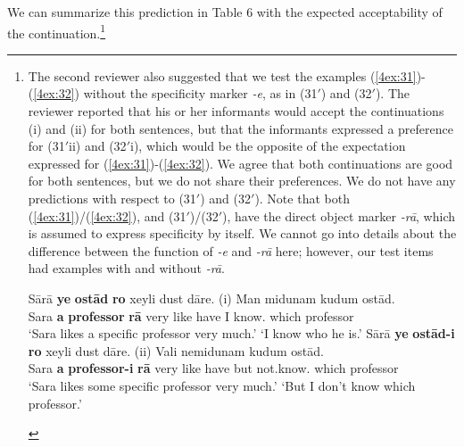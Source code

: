 \documentclass[output=paper]{langsci/langscibook}
\begin{document}
\largerpage[2]
We can summarize this prediction in Table 6 with the expected acceptability of the continuation.\footnote{The second reviewer also suggested that we test the examples (\ref{4ex:31})-(\ref{4ex:32}) without the specificity marker {\emph{-e}}, as in (31$'$) and (32$'$). The reviewer reported that his or her informants would accept the continuations (i) and (ii) for both sentences, but that the informants expressed a preference for (31$'$ii) and (32$'$i), which would be the opposite of the expectation expressed for (\ref{4ex:31})-(\ref{4ex:32}). We agree that both continuations are good for both sentences, but we do not share their preferences. We do not have any predictions with respect to (31$'$) and (32$'$). Note that both (\ref{4ex:31})/(\ref{4ex:32}), and (31$'$)/(32$'$), have the direct object marker {\emph{-rā}}, which is assumed to express specificity by itself. We cannot go into details about the difference between the function of {\emph{-e}} and {\emph{-rā}} here; however, our test items had examples with and without {\emph{-rā}}.

\begin{exe}
\gll	Sārā		{\bf{ye}}	{\bf{ostād}}	{\bf{ro}}	xeyli dust  dāre. 	\hspace*{1.25cm}(i) 	Man midunam   kudum ostād. \\
         Sara 	{\bf{a}}	{\bf{professor}}	{\bf{rā}}	very  like   have			  		{}	I     know.{} which professor \\
\glt	`Sara likes a specific professor very much.'					\hspace*{0.75cm}	`I know who he is.'
\gll	Sārā		{\bf{ye}}	{\bf{ostād-i}} 	{\bf{ro}}   	xeyli dust dāre. 		\hspace*{1cm}(ii)	Vali nemidunam     kudum ostād. \\
	Sara		{\bf{a}}	{\bf{professor-i}}	{\bf{rā}} very  like  have				{}	but  not.know.{} which  professor \\
\glt	`Sara likes some specific professor very much.'					\hspace*{0.35cm}	`But I don't know which professor.'
\end{exe}}\clearpage
\end{document}

